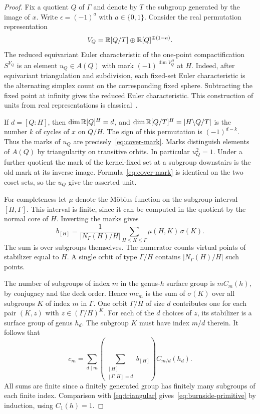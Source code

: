 \begin{proof}
Fix a quotient $Q$ of $\Gamma$ and denote by $T$ the subgroup
generated by the image of $x$. Write $\epsilon=(-1)^a$ with
$a\in\{0,1\}$. Consider the real permutation representation
\[
       V_Q=\mathbb R[Q/T]\oplus\mathbb R[Q]^{\oplus(1-a)}.
\]
The reduced equivariant Euler characteristic of the one-point
compactification $S^{V_Q}$ is an element $u_Q\in A(Q)$ with mark
$(-1)^{\dim V_Q^H}$ at $H$. Indeed, after equivariant triangulation
and subdivision, each fixed-set Euler characteristic is the
alternating simplex count on the corresponding fixed sphere.
Subtracting the fixed point at infinity gives the reduced Euler
characteristic. This construction of units from real representations
is classical~\cite[Proposition~5.8.2]{tomdieck}.

If $d=[Q:H]$, then $\dim\mathbb R[Q]^H=d$, and
$\dim\mathbb R[Q/T]^H=|H\backslash Q/T|$ is the number $k$ of cycles
of $x$ on $Q/H$. The sign of this permutation is $(-1)^{d-k}$.
Thus the marks of $u_Q$ are precisely~\eqref{eq:cover-mark}.
Marks distinguish elements of $A(Q)$ by triangularity on transitive
orbits. In particular $u_Q^2=1$. Under a further quotient the
mark of the kernel-fixed set at a subgroup downstairs is the old
mark at its inverse image. Formula~\eqref{eq:cover-mark} is identical
on the two coset sets, so the $u_Q$ give the asserted unit.

For completeness let $\mu$ denote the M\"obius function on the
subgroup interval $[H,\Gamma]$. This interval is finite, since it
can be computed in the quotient by the normal core of $H$.
Inverting the marks gives
\begin{equation}
 b_{[H]}=\frac{1}{|N_\Gamma(H)/H|}
                 \sum_{H\le K\le\Gamma}\mu(H,K)\,\sigma(K).
\label{eq:stabilizer-inversion}
\end{equation}
The sum is over subgroups themselves. The numerator counts virtual
points of stabilizer equal to $H$. A single orbit of type $\Gamma/H$
contains $|N_\Gamma(H)/H|$ such points.

The number of subgroups of index $m$ in the genus-$h$ surface group
is $mC_m(h)$, by conjugacy and the deck order. Hence $mc_m$ is the
sum of $\sigma(K)$ over all subgroups $K$ of index $m$ in $\Gamma$.
One orbit $\Gamma/H$ of size $d$ contributes one for each pair
$(K,z)$ with $z\in(\Gamma/H)^K$. For each of the $d$ choices of $z$,
its stabilizer is a surface group of genus $h_d$. The subgroup
$K$ must have index $m/d$ therein. It follows that
\[
 c_m=\sum_{d\mid m}
       \left(\sum_{\substack{[H]\\{[\Gamma:H]=d}}} b_{[H]}\right)
                C_{m/d}(h_d).
\]
All sums are finite since a finitely generated group has finitely
many subgroups of each finite index. Comparison with
\eqref{eq:triangular} gives~\eqref{eq:burnside-primitive} by induction,
using $C_1(h)=1$.


\end{proof}
